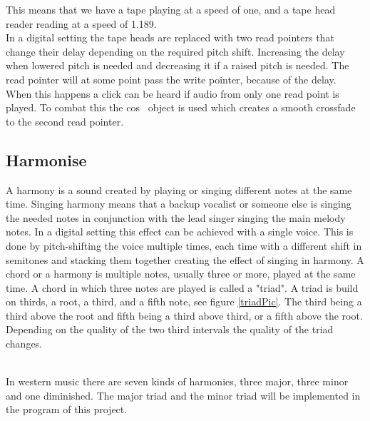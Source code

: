 This means that we have a tape playing at a speed of one, and a tape head reader reading at a speed of 1.189. \\

In a digital setting the tape heads are replaced with two read pointers that change their delay depending on the required pitch shift. Increasing the delay when lowered pitch is needed and decreasing it if a raised pitch is needed. 
The read pointer will at some point pass the write pointer, because of the delay. When this happens a click can be heard if audio from only one read point is played. To combat this the cos~ object is used which creates a smooth crossfade to the second read pointer.

\subsection{Harmonise}

A harmony is a sound created by playing or singing different notes at the same time\citep{Harmonise02}.
Singing harmony means that a backup vocalist or someone else is singing the needed notes in conjunction with the lead singer singing the main melody notes. In a digital setting this effect can be achieved with a single voice. This is done by pitch-shifting the voice multiple times, each time with a different shift in semitones and stacking them together creating the effect of singing in harmony. 
A chord or a harmony is multiple notes, usually three or more, played at the same time. A chord in which three notes are played is called a "triad"\citep{Harmonise01}. A triad is build on thirds, a root, a third, and a fifth note, see figure \ref{triadPic}. The third being a third above the root and fifth being a third above third, or a fifth above the root. Depending on the quality of the two third intervals the quality of the triad changes. \\

\begin{minipage}{\linewidth}%
\label{triadPic}
\end{minipage}\\

In western music there are seven kinds of harmonies, three major, three minor and one diminished. The major triad and the minor triad will be implemented in the program of this project.